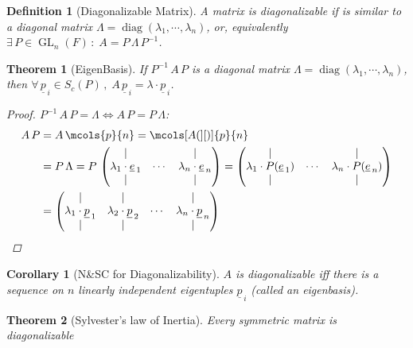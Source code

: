 \documentclass[12pt]{article}
\let\LR\Leftrightarrow
\newcommand{\Forall}[1]{\forall\,{#1}\,,\;}
\newcommand{\Exist}[1]{\exists\,{#1}\,:\;}
\newcommand{\tuple}[1]{\underline{#1}}
\DeclareMathOperator{\GL}{GL}
\DeclareMathOperator{\diag}{diag}
\newtheorem{theorem}{Theorem}[subsection]
\newtheorem{definition}{Definition}[subsection]
\newtheorem{corollary}{Corollary}[subsection]
\begin{document}
\begin{definition}[Diagonalizable Matrix]
  A matrix is diagonalizable if is similar to a diagonal matrix $\Lambda=\diag(\lambda_1,\cdots,\lambda_n)$, or, equivalently $\Exist{P\in\GL_n(F)}A=P\,\Lambda\,P^{-1}$.
\end{definition}

\begin{theorem}[EigenBasis]
  If $P^{-1}\,A\,P$ is a diagonal matrix $\Lambda=\diag(\lambda_1,\cdots,\lambda_n)$, then $\Forall{\tuple{p}_{\,i}\in S_c(P)} A\,\tuple{p}_{\,i}=\lambda\cdot \tuple{p}_{\,i}$.
  \begin{proof}
    $P^{-1}\,A\,P=\Lambda\LR A\,P=P\,\Lambda$:
    \begin{align*}
      A\,P&=A\,\mcols{p}{n}
      =\mcols[A(][)]{p}{n}\\
      &=P\,\Lambda=P\,\begin{pmatrix}
        | &\,&|\\
        \lambda_1\cdot\tuple{e}_{\,1}&\cdots&\lambda_n\cdot\tuple{e}_{\,n}\\
        | &\,&|
      \end{pmatrix}
      =\begin{pmatrix}
        | &\,&|\\
        \lambda_1\cdot P(\tuple{e}_{\,1})&\cdots&\lambda_n\cdot P(\tuple{e}_{\,n})\\
        | &\,&|
      \end{pmatrix}\\
      &=\begin{pmatrix}
        | &| &\,&|\\
        \lambda_1\cdot\tuple{p}_{\,1}&\lambda_2\cdot\tuple{p}_{\,2}&\cdots&\lambda_n\cdot\tuple{p}_{\,n}\\
        | &| &\,&|
      \end{pmatrix}
    \end{align*}
  \end{proof}
\end{theorem}

\begin{corollary}[N\&SC for Diagonalizability]
  $A$ is diagonalizable iff there is a sequence on $n$ linearly independent eigentuples $\tuple{p}_{\,i}$ (called an eigenbasis).
\end{corollary}

\begin{theorem}[Sylvester's law of Inertia]
  Every symmetric matrix is diagonalizable
\end{theorem}
\end{document}
